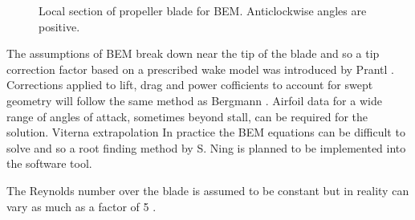 \documentclass{article}
\begin{document}
\begin{figure}[H]
    \centering
    \caption{Local section of propeller blade for BEM. Anticlockwise angles are positive.}
    \label{fig:bem_section}
\end{figure}
The assumptions of BEM break down near the tip of the blade and so a tip correction factor based on a prescribed wake model was introduced by Prantl \cite{prandtl_loss}.
Corrections applied to lift, drag and power cofficients to account for swept geometry will follow the same method as Bergmann \cite{bergmann_sweep}.
Airfoil data for a wide range of angles of attack, sometimes beyond stall, can be required for the solution.
Viterna extrapolation \cite{MAHMUDDIN2017811}
In practice the BEM equations can be difficult to solve and so a root finding method by S. Ning \cite{Ning_BEM} is planned to be implemented into the software tool.

The Reynolds number over the blade is assumed to be constant but in reality can vary as much as a factor of 5 \cite{?}.

\end{document}

